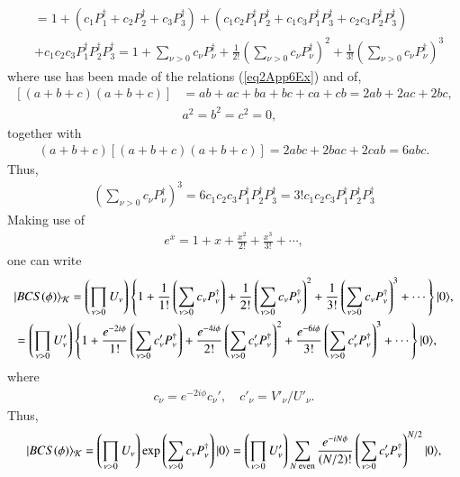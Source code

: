 \begin{subappendices}
\begin{align}
\nonumber&=1+\left(c_1P_1^\dagger+c_2P_2^\dagger+c_3P_3^\dagger\right)+\left(c_1c_2P_1^\dagger P_2^\dagger+c_1c_3P_1^\dagger P_3^\dagger+c_2c_3P_2^\dagger P_3^\dagger\right)\\
&+c_1c_2c_3P_1^\dagger P_2^\dagger P_3^\dagger=1+\sum_{\nu>0}c_\nu P_\nu^\dagger + \frac{1}{2!}\left(\sum_{\nu>0}c_\nu P^\dagger_\nu\right)^2+\frac{1}{3!}\left(\sum_{\nu>0}c_\nu P^\dagger_\nu\right)^3
\end{align}
where use has been made of the relations (\ref{eq2App6Ex}) and of,
\begin{align}
\nonumber \left[\left(a+b+c\right)\left(a+b+c\right)\right]&=ab+ac+ba +bc+ca+cb=2ab+2ac+2bc,\\
\nonumber & a^2=b^2=c^2=0,
\end{align}
together with
\begin{align}\label{eq2App9Ex}
 (a+b+c)\left[\left(a+b+c\right)\left(a+b+c\right)\right]=2abc+2bac+2cab=6abc.
\end{align}
Thus,
\begin{align}\label{eq2App10Ex}
\left(\sum_{\nu>0}c_\nu P_\nu^\dagger\right)^3=6c_1c_2c_3P_1^\dagger P_2^\dagger P_3^\dagger=3!c_1c_2c_3P_1^\dagger P_2^\dagger P_3^\dagger
\end{align}
Making use of
\begin{align}\label{eq2App11Ex}
e^x=1+x+\frac{x^2}{2!}+\frac{x^3}{3!}+\cdots,
\end{align}
one can write
\begin{align}\label{eq1App11Ex} 
\nonumber &|{BCS(\phi)} \rangle_{\mathcal K}=\left(\prod_{\nu>0}U_\nu\right)\left\{1+\frac{1}{1!}\left(\sum_{\nu>0}c_\nu P_\nu^\dagger\right)+\frac{1}{2!}\left(\sum_{\nu>0}c_\nu P_\nu^\dagger\right)^2+\frac{1}{3!}\left(\sum_{\nu>0}c_\nu P_\nu^\dagger\right)^3+\cdots\right\}|{0} \rangle,\\
&=\left(\prod_{\nu>0}U'_\nu\right)\left\{1+\frac{e^{-2i\phi}}{1!}\left(\sum_{\nu>0}c'_\nu P_\nu^\dagger\right)+\frac{e^{-4i\phi}}{2!}\left(\sum_{\nu>0}c'_\nu P_\nu^\dagger\right)^2+\frac{e^{-6i\phi}}{3!}\left(\sum_{\nu>0}c'_\nu P_\nu^\dagger\right)^3+\cdots\right\}|{0} \rangle,
\end{align}
where
\begin{align}\label{eq2App12Ex}
 c_\nu=e^{-2i\phi}c_\nu',\quad c'_\nu=V'_\nu/U'_\nu.
\end{align}
Thus,
\begin{align}\label{eq2App13Ex}
\ket{BCS(\phi)}_{\mathcal K}=\left(\prod_{\nu>0}U_\nu\right)\exp\left(\sum_{\nu>0}c_\nu P_\nu^\dagger\right)\ket{0}=\left(\prod_{\nu>0}U'_\nu\right)\sum_{N \text{ even}}\frac{e^{-iN\phi}}{(N/2)!}\left(\sum_{\nu>0}c'_\nu P_\nu^\dagger\right)^{N/2}\ket{0},

\end{align}
\end{subappendices}
